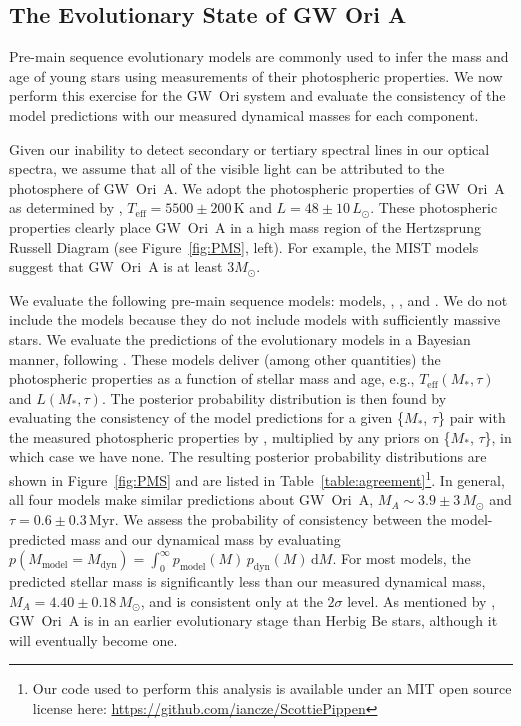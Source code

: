 \documentclass[twocolumn]{aastex6}
\begin{document}
\subsection{The Evolutionary State of GW Ori A}
Pre-main sequence evolutionary models are commonly used to infer the mass and age of young stars using measurements of their photospheric properties. We now perform this exercise for the GW~Ori system and evaluate the consistency of the model predictions with our measured dynamical masses for each component.

Given our inability to detect secondary or tertiary spectral lines in our optical spectra, we assume that all of the visible light can be attributed to the photosphere of GW~Ori~A. We adopt the photospheric properties of GW~Ori~A as determined by \citet{fang14}, $T_\mathrm{eff} = 5500 \pm 200\,\mathrm{K}$ and $L = 48 \pm 10\,L_\odot$. These photospheric properties clearly place GW~Ori~A in a high mass region of the Hertzsprung Russell Diagram (see Figure~\ref{fig:PMS}, left). For example, the MIST models suggest that GW~Ori~A is at least $3 M_\odot$.

We evaluate the following pre-main sequence models: \citet{choi16} models, \citet{dotter08}, \citet{tognelli11}, and \citet{siess00}. We do not include the \citet{baraffe15} models because they do not include models with sufficiently massive stars. We evaluate the predictions of the evolutionary models in a Bayesian manner, following \citet{jorgensen05}. These models deliver (among other quantities) the photospheric properties as a function of stellar mass and age,
e.g., $T_\mathrm{eff}(M_\ast, \tau)$ and $L(M_\ast, \tau)$. The posterior probability distribution is then found by evaluating the consistency of the model predictions for a given \{$M_\ast$, $\tau$\} pair with the measured photospheric properties by \citet{fang14}, multiplied by any priors on  \{$M_\ast$, $\tau$\}, in which case we have none. The resulting posterior probability distributions are shown in Figure~\ref{fig:PMS} and are listed in Table~\ref{table:agreement}\footnote{Our code used to perform this analysis is available under an MIT open source license here: \url{https://github.com/iancze/ScottiePippen}}. In general, all four models make similar predictions about GW~Ori~A, $M_A \sim 3.9 \pm 3\,M_\odot$ and $\tau = 0.6 \pm 0.3\,$Myr. We assess the probability of consistency between the model-predicted mass and our dynamical mass by evaluating $p(M_\mathrm{model} = M_\mathrm{dyn}) = \int_0^\infty p_\mathrm{model}(M) \, p_\mathrm{dyn}(M) \, \mathrm{d}M$. For most models, the predicted stellar mass is significantly less than our measured dynamical mass, $M_A = 4.40 \pm 0.18\,M_\odot$, and is consistent only at the $2\sigma$ level. As mentioned by \citet{fang14}, GW~Ori~A is in an earlier evolutionary stage than Herbig Be stars, although it will eventually become one.
\end{document}
